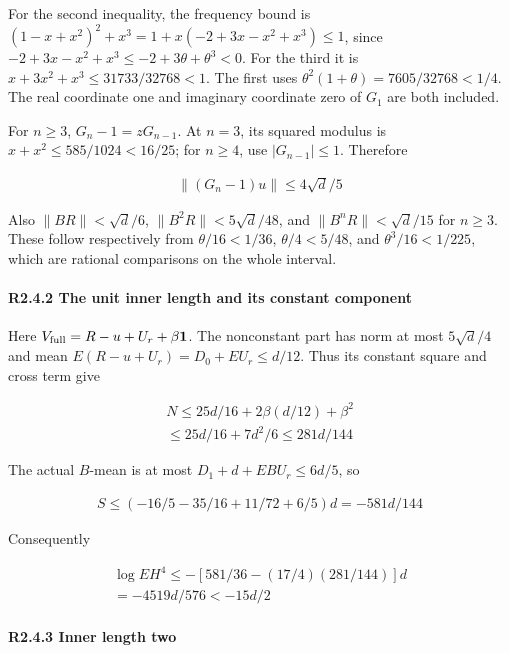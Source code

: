 For the second inequality, the frequency bound is \((1-x+x^2)^2+x^3=1+x(-2+3x-x^2+x^3)\le1\), since \(-2+3x-x^2+x^3\le-2+3\theta+\theta^3<0\). For the third it is \(x+3x^2+x^3\le31733/32768<1\). The first uses \(\theta^2(1+\theta)=7605/32768<1/4\). The real coordinate one and imaginary coordinate zero of \(G_1\) are both included.

For \(n\ge3\), \(G_n-1=zG_{n-1}\). At \(n=3\), its squared modulus is \(x+x^2\le585/1024<16/25\); for \(n\ge4\), use \(|G_{n-1}|\le1\). Therefore

\[
\begin{gathered}
\|(G_n-1)u\|\le 4\sqrt{d}/5
\end{gathered}
\]

Also \(\|BR\|<\sqrt d/6\), \(\|B^2R\|<5\sqrt d/48\), and \(\|B^nR\|<\sqrt d/15\) for \(n\ge3\). These follow respectively from \(\theta/16<1/36\), \(\theta/4<5/48\), and \(\theta^3/16<1/225\), which are rational comparisons on the whole interval.

\paragraph{R2.4.2 The unit inner length and its constant component}

Here \(V_{\rm full}=R-u+U_r+\beta\mathbf1\). The nonconstant part has norm at most \(5\sqrt d/4\) and mean \(E(R-u+U_r)=D_0+EU_r\le d/12\). Thus its constant square and cross term give

\[
\begin{gathered}
N\le 25d/16+2\beta(d/12)+\beta^2\\
\le 25d/16+7d^2/6\le 281d/144 
\end{gathered}\tag{R2.4.2}
\]

The actual \(B\)-mean is at most \(D_1+d+EBU_r\le6d/5\), so

\[
\begin{gathered}
S\le (-16/5-35/16+11/72+6/5)d=-581d/144
\end{gathered}
\]

Consequently

\[
\begin{gathered}
\log EH^4\le -[581/36-(17/4)(281/144)]d\\
=-4519d/576<-15d/2 
\end{gathered}\tag{R2.4.3}
\]

\paragraph{R2.4.3 Inner length two}

